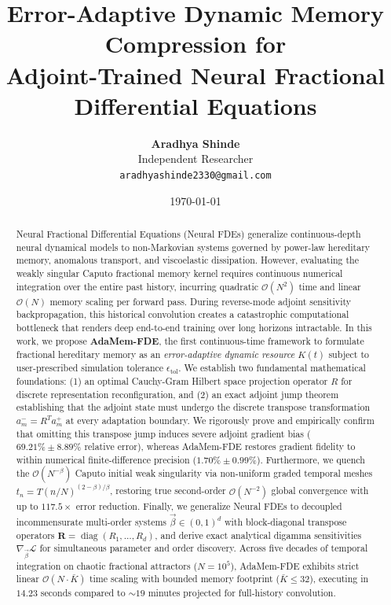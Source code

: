 \documentclass[11pt,a4paper]{article}
\title{\textbf{Error-Adaptive Dynamic Memory Compression for\\Adjoint-Trained Neural Fractional Differential Equations}}
\author{
  \textbf{Aradhya Shinde} \\
  Independent Researcher \\
  \texttt{aradhyashinde2330@gmail.com}
}
\date{\today}
\theoremstyle{plain}
\theoremstyle{definition}
\newcommand{\etol}{\epsilon_{\mathrm{tol}}}
\newcommand{\diag}{\operatorname{diag}}
\begin{document}
\maketitle

\begin{abstract}
Neural Fractional Differential Equations (Neural FDEs) generalize continuous-depth neural dynamical models to non-Markovian systems governed by power-law hereditary memory, anomalous transport, and viscoelastic dissipation. However, evaluating the weakly singular Caputo fractional memory kernel requires continuous numerical integration over the entire past history, incurring quadratic $\mathcal{O}(N^2)$ time and linear $\mathcal{O}(N)$ memory scaling per forward pass. During reverse-mode adjoint sensitivity backpropagation, this historical convolution creates a catastrophic computational bottleneck that renders deep end-to-end training over long horizons intractable. In this work, we propose \textbf{AdaMem-FDE}, the first continuous-time framework to formulate fractional hereditary memory as an \emph{error-adaptive dynamic resource} $K(t)$ subject to user-prescribed simulation tolerance $\etol$. We establish two fundamental mathematical foundations: (1) an optimal Cauchy-Gram Hilbert space projection operator $R$ for discrete representation reconfiguration, and (2) an exact adjoint jump theorem establishing that the adjoint state must undergo the discrete transpose transformation $a_m^- = R^T a_m^+$ at every adaptation boundary. We rigorously prove and empirically confirm that omitting this transpose jump induces severe adjoint gradient bias ($69.21\% \pm 8.89\%$ relative error), whereas AdaMem-FDE restores gradient fidelity to within numerical finite-difference precision ($1.70\% \pm 0.99\%$). Furthermore, we quench the $\mathcal{O}(N^{-\beta})$ Caputo initial weak singularity via non-uniform graded temporal meshes $t_n = T(n/N)^{(2-\beta)/\beta}$, restoring true second-order $\mathcal{O}(N^{-2})$ global convergence with up to $117.5\times$ error reduction. Finally, we generalize Neural FDEs to decoupled incommensurate multi-order systems $\vec{\beta} \in (0, 1)^d$ with block-diagonal transpose operators $\mathbf{R} = \diag(R_1, \dots, R_d)$, and derive exact analytical digamma sensitivities $\nabla_{\vec{\beta}} \mathcal{L}$ for simultaneous parameter and order discovery. Across five decades of temporal integration on chaotic fractional attractors ($N = 10^5$), AdaMem-FDE exhibits strict linear $\mathcal{O}(N \cdot \bar{K})$ time scaling with bounded memory footprint ($\bar{K} \le 32$), executing in $14.23$ seconds compared to $\sim 19$ minutes projected for full-history convolution.
\end{abstract}
\end{document}
